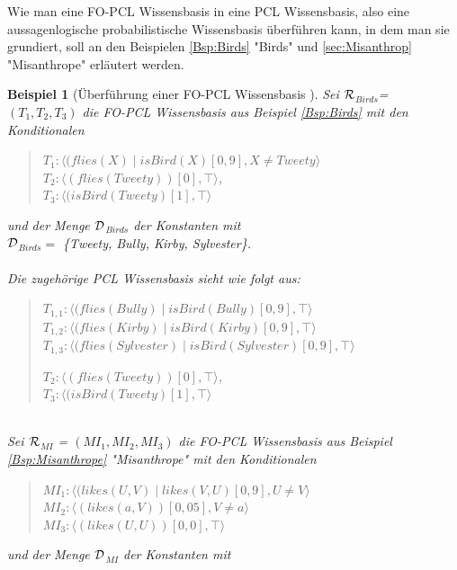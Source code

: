 \documentclass[a4paper, 11pt]{book}
\newtheorem{Bsp}{Beispiel}[section]
\begin{document}
	Wie man eine FO-PCL Wissensbasis in eine PCL Wissensbasis, also eine aussagenlogische probabilistische Wissensbasis überführen kann, in dem man sie grundiert, soll an den Beispielen  \ref{Bsp:Birds} "{}Birds"{} und \ref{sec:Misanthrop} "{}Misanthrope"{}  erläutert werden.
\begin{Bsp}[Überführung einer FO-PCL Wissensbasis ]

	Sei $ \cal{R} $$_{Birds} $= $ (T_1, T_2, T_3)  $ die FO-PCL Wissensbasis aus Beispiel  \ref{Bsp:Birds} mit den Konditionalen 
	\begin{quote}
	$ T_{1} : \langle (flies(X) \mid isBird(X)[0,9], X \neq Tweety \rangle$\\
	$ T_{2}  :  \langle (flies(Tweety))[0], \top \rangle $,\\
	$ T_{3} : \langle (isBird(Tweety) [1], \top \rangle$\\

	\end{quote}
	und der Menge $ \cal{D} $$_{Birds}  $ der Konstanten mit\\
	$ \cal{D} $$_{Birds} = $ \{Tweety, Bully, Kirby, Sylvester\}. \\
	\\
	Die zugehörige PCL Wissensbasis sieht wie folgt aus:
	\begin{quote}
	$ T_{1,1} : \langle (flies(Bully) \mid isBird(Bully)[0,9], \top \rangle$\\
	$ T_{1,2} : \langle (flies(Kirby) \mid isBird(Kirby)[0,9], \top \rangle$\\
	$ T_{1,3} : \langle (flies(Sylvester) \mid isBird(Sylvester)[0,9], \top \rangle$
		
	$ T_{2}  :  \langle (flies(Tweety))[0], \top \rangle $,\\
	$ T_{3} : \langle (isBird(Tweety) [1], \top \rangle$\\

	\end{quote}
	\noindent
	\\
	Sei $ \cal{R} $$_{MI} $ = $ (MI_1, MI_2, MI_3)  $ die FO-PCL Wissensbasis aus Beispiel \ref{Bsp:Misanthrope} "{}Misanthrope"{} mit den Konditionalen 
	\begin{quote}
	$ MI_1 : \langle (likes(U, V) \mid likes(V, U)[0,9], U \neq V \rangle$\\
	$ MI_2 : \langle (likes(a, V))[0,05], V \neq a \rangle$\\
	$ MI_{3} : \langle (likes(U, U))[0,0], \top \rangle$\\
	\end{quote}
	und der Menge $ \cal{D} $$_{MI}  $ der Konstanten mit
	

\end{Bsp}
\end{document}
